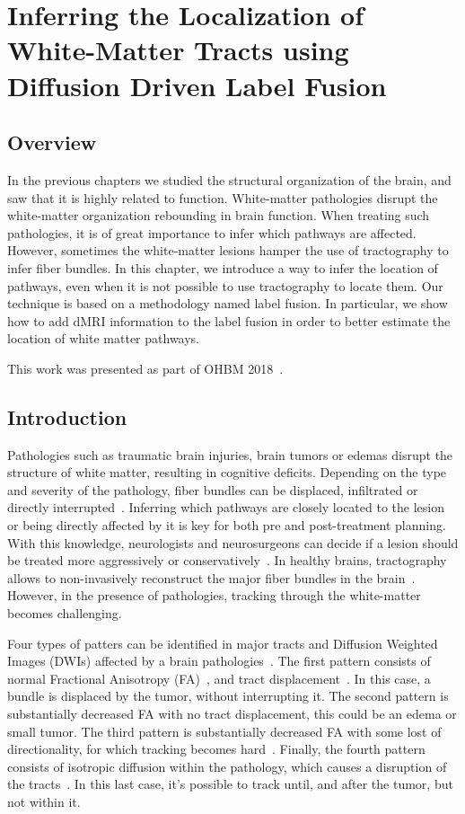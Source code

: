 \chapter{Inferring the Localization of White-Matter Tracts using Diffusion Driven Label Fusion}

\section{Overview}
In the previous chapters we studied the structural organization of the brain,
and saw that it is highly related to function. White-matter pathologies
disrupt the white-matter organization rebounding in brain function. When
treating such pathologies, it is of great importance to infer which pathways are
affected. However, sometimes the white-matter lesions hamper the use of
tractography to infer fiber bundles. 
In this chapter, we introduce a way to infer the location of pathways, even
when it is not possible to use tractography to locate them. Our technique is
based on a methodology named label fusion. In particular, we show how to add
dMRI information to the label fusion in order to better estimate the location
of white matter pathways.

This work was presented as part of OHBM 2018~\cite{Guillermo2018}.

\section{Introduction}
Pathologies such as traumatic brain injuries, brain tumors or edemas disrupt
the structure of white matter, resulting in cognitive deficits. Depending on
the type and severity of the pathology, fiber bundles can be displaced,
infiltrated or directly interrupted~\cite{Schonberg2006, Huisman2009, Won2016}.
Inferring which pathways are closely located to the lesion or being directly
affected by it is key for both pre and post-treatment planning. With this
knowledge, neurologists and neurosurgeons can decide if a lesion should be
treated more aggressively or  conservatively~\cite{Huisman2009, McGirt2009}.
In healthy brains, tractography allows to non-invasively reconstruct the major
fiber bundles in the brain~\cite{Catani2008}. However, in the presence of 
pathologies, tracking through the white-matter becomes challenging.

Four types of patters can be identified in major tracts and Diffusion Weighted
Images (DWIs) affected by a brain pathologies~\cite{Pictorial2004}. The first
pattern consists of normal Fractional Anisotropy (FA)~\cite{Basser1996}, and
tract displacement~\cite{Pictorial2004}. In this case, a
bundle is displaced by the tumor, without interrupting it. The second pattern
is substantially decreased FA with no tract displacement, this could be
an edema or small tumor\cite{Schonberg2006, Huisman2009}.
The third pattern is substantially decreased FA with some lost of directionality,
for which tracking becomes hard~\cite{Schonberg2006, Pictorial2004}. Finally,
the fourth pattern consists of isotropic diffusion within the pathology,
which causes a disruption of the tracts~\cite{Pictorial2004}.
In this last case, it's possible to track until, and after the tumor, but not
within it.

